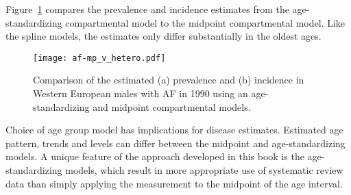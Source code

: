 Figure~\ref{fig:app-af compare} compares the prevalence and incidence
estimates from the age-standardizing compartmental model to the
midpoint compartmental model.  Like the spline models, the
estimates only differ substantially in the oldest ages.

    \begin{figure}[h]
        \begin{center}
            \texttt{[image: af-mp\_v\_hetero.pdf]}
            \caption{Comparison of the estimated (a) prevalence and (b) incidence
              in Western European males with AF in 1990
              using an age-standardizing and midpoint compartmental models.}
            \label{fig:app-af compare}
        \end{center}
    \end{figure}

Choice of age group model has implications for disease estimates.
Estimated age pattern, trends and levels can differ between the
midpoint and age-standardizing models.  A unique feature of the
approach developed in this book is the age-standardizing models, which
result in more appropriate use of systematic review data than simply
applying the measurement to the midpoint of the age interval.
